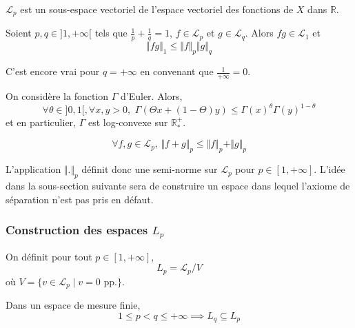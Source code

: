 	\begin{proposition}
		$\mathcal{L}_p$ est un sous-espace vectoriel de l'espace vectoriel des fonctions de $X$ dans $\mathbb{R}$.
	\end{proposition}


	\begin{theorem}
		Soient $p, q \in ]1, +\infty[$ tels que $\frac{1}{p} + \frac{1}{q} = 1$, $f \in \mathcal{L}_p$ et $g \in \mathcal{L}_q$. Alors $fg \in \mathcal{L}_1$ et
		\[ \Vert fg \Vert_1 \leq \Vert f \Vert_p \Vert g \Vert_q \]
	\end{theorem}

	\begin{remark}
		C'est encore vrai pour $q = +\infty$ en convenant que $\frac{1}{+\infty} = 0$.
	\end{remark}

	\begin{application}
		On considère la fonction $\Gamma$ d'Euler. Alors,
		\[ \forall \theta \in ]0,1[, \forall x, y > 0, \, \, \Gamma(\Theta x + (1 - \Theta)y) \leq \Gamma(x)^{\theta} \Gamma(y)^{1 - \theta} \]
		et en particulier, $\Gamma$ est log-convexe sur $\mathbb{R}^+_*$.
	\end{application}

	\begin{theorem}
		\[ \forall f, g \in \mathcal{L}_p, \, \Vert f + g \Vert_p \leq \Vert f \Vert_p + \Vert g \Vert_p \]
	\end{theorem}

	L'application $\Vert . \Vert_p$ définit donc une semi-norme sur $\mathcal{L}_p$ pour $p \in [1, +\infty]$. L'idée dans la sous-section suivante sera de construire un espace dans lequel l'axiome de séparation n'est pas pris en défaut.

	\subsubsection{Construction des espaces \texorpdfstring{$L_p$}{Lp}}

	\begin{definition}
		On définit pour tout $p \in [1, +\infty]$,
		\[ L_p = \mathcal{L}_p / V \]
		où $V = \{ v \in \mathcal{L}_p \mid v = 0 \text{ pp.} \}$.
	\end{definition}

	\begin{proposition}
		Dans un espace de mesure finie,
		\[ 1 \leq p < q \leq +\infty \implies L_q \subseteq L_p \]
	\end{proposition}

